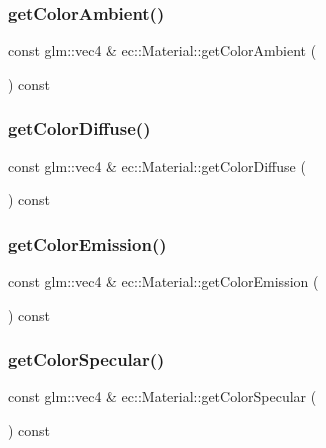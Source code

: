 \subsubsection{\texorpdfstring{get\+Color\+Ambient()}{getColorAmbient()}}
{\footnotesize\ttfamily const glm\+::vec4 \& ec\+::\+Material\+::get\+Color\+Ambient (\begin{DoxyParamCaption}{ }\end{DoxyParamCaption}) const}

\mbox{\label{classec_1_1_material_a6156c82b63756da91d013b5eb39fccf5}} 
\subsubsection{\texorpdfstring{get\+Color\+Diffuse()}{getColorDiffuse()}}
{\footnotesize\ttfamily const glm\+::vec4 \& ec\+::\+Material\+::get\+Color\+Diffuse (\begin{DoxyParamCaption}{ }\end{DoxyParamCaption}) const}

\mbox{\label{classec_1_1_material_af6a4a55683956cd0b06d0a8de1dc4b9f}} 
\subsubsection{\texorpdfstring{get\+Color\+Emission()}{getColorEmission()}}
{\footnotesize\ttfamily const glm\+::vec4 \& ec\+::\+Material\+::get\+Color\+Emission (\begin{DoxyParamCaption}{ }\end{DoxyParamCaption}) const}

\mbox{\label{classec_1_1_material_a0a4a766b22c9adeffdff5c0d5140167e}} 
\subsubsection{\texorpdfstring{get\+Color\+Specular()}{getColorSpecular()}}
{\footnotesize\ttfamily const glm\+::vec4 \& ec\+::\+Material\+::get\+Color\+Specular (\begin{DoxyParamCaption}{ }\end{DoxyParamCaption}) const}

